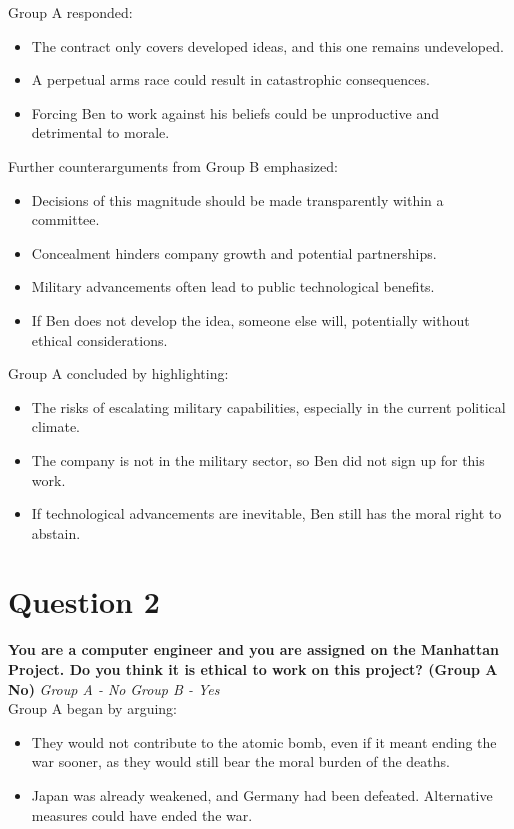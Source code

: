 \documentclass[12pt]{article}
\begin{document}
\noindent Group A responded:
{\fontsize{11pt}{13pt}\selectfont
\begin{itemize}
\setlength{\itemsep}{4pt}
    \item The contract only covers developed ideas, and this one remains undeveloped.
    \item A perpetual arms race could result in catastrophic consequences.
    \item Forcing Ben to work against his beliefs could be unproductive and detrimental to morale.
\end{itemize}
}

\noindent Further counterarguments from Group B emphasized:
{\fontsize{11pt}{13pt}\selectfont
\begin{itemize}
\setlength{\itemsep}{4pt} 
    \item Decisions of this magnitude should be made transparently within a committee.
    \item Concealment hinders company growth and potential partnerships.
    \item Military advancements often lead to public technological benefits.
    \item If Ben does not develop the idea, someone else will, potentially without ethical considerations.
\end{itemize}
}

\noindent Group A concluded by highlighting:
{\fontsize{11pt}{13pt}\selectfont
\begin{itemize}
\setlength{\itemsep}{4pt} 
    \item The risks of escalating military capabilities, especially in the current political climate.
    \item The company is not in the military sector, so Ben did not sign up for this work.
    \item If technological advancements are inevitable, Ben still has the moral right to abstain.
\end{itemize}
}

\section{Question 2}
\textbf{You are a computer engineer and you are assigned on the Manhattan Project. Do you think it is ethical to work on this project? (Group A No)}
\textit {Group A - No}
\textit {Group B - Yes}\\

\noindent Group A began by arguing:  
{\fontsize{11pt}{13pt}\selectfont  
\begin{itemize}  
\setlength{\itemsep}{4pt}   
    \item They would not contribute to the atomic bomb, even if it meant ending the war sooner, as they would still bear the moral burden of the deaths.  
    \item Japan was already weakened, and Germany had been defeated. Alternative measures could have ended the war.  
\end{itemize}  
}  
\end{document}
